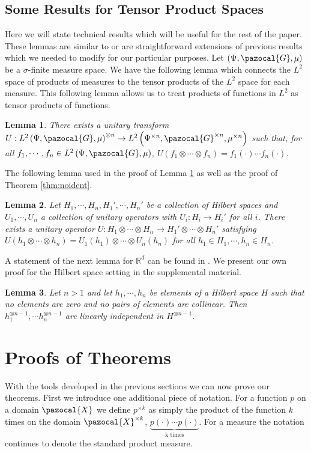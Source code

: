 \documentclass{article} %
\def\rn{\mathbb{R}}
\def\sG{\pazocal{G}}
\def\sX{\pazocal{X}}
\newtheorem{lem}{Lemma}
\theoremstyle{definition}
\begin{document}
\subsection{Some Results for Tensor Product Spaces}
Here we will state technical results which will be useful for the rest of the paper. These lemmas are similar to or  are straightforward extensions of previous results which we needed to modify for our particular purposes. Let $\left( \Psi, \sG, \mu \right)$ be a $\sigma$-finite measure space. We have the following lemma which connects the $L^2$ space of products of measures to the tensor products of the $L^2$ space for each measure. This following lemma allows us to treat products of functions in $L^2$ as tensor products of functions. 
\begin{lem}
	\label{lem:l2prod}
	There exists a unitary transform $U:L^2\left( \Psi, \sG, \mu \right)^{\otimes n} \to L^2\left( \Psi^{\times n}, \sG^{\times n}, \mu^{\times n} \right)$ such that, for all $f_1,\cdots, f_n \in L^2\left( \Psi, \sG, \mu \right)$, $U\left( f_1\otimes \cdots \otimes f_n \right) = f_1(\cdot)\cdots f_n(\cdot)$.
\end{lem}
The following lemma used in the proof of Lemma \ref{lem:l2prod} as well as the proof of Theorem \ref{thm:noident}.
\begin{lem} \label{lem:unitprod}
	Let $H_1,\cdots, H_n, H_1',\cdots, H_n'$ be a collection of Hilbert spaces and $U_1,\cdots,U_n$ a collection of unitary operators with $U_i:H_i \to H_i'$ for all $i$. There exists a unitary operator $U:H_1 \otimes \cdots \otimes H_n \to H_1' \otimes \cdots \otimes H_n'$ satisfying $U\left( h_1 \otimes\cdots \otimes h_n \right) = U_1(h_1) \otimes \cdots \otimes U_n(h_n)$ for all $h_1 \in H_1 ,\cdots, h_n \in H_n$.
\end{lem}
A statement of the next lemma for $\rn^d$ can be found in \cite{symtensorrank}. We present our own proof for the Hilbert space setting in the supplemental material.
\begin{lem}\label{lem:linind}
	Let $n>1$ and let $h_1,\cdots, h_n$ be elements of a Hilbert space $H$ such that no elements are zero and no pairs of elements are collinear. Then $h_1^{\otimes n-1},\cdots h_n^{\otimes n-1}$ are linearly independent in $H^{\otimes n-1}$.
\end{lem}

\section{Proofs of Theorems}
With the tools developed in the previous sections we can now prove our theorems. First we introduce one additional piece of notation. For a function $p$ on a domain $\sX$ we define $p^{\times k}$ as simply the product of the function $k$ times on the domain $\sX^{\times k}$, $\underbrace{p(\cdot)\cdots p(\cdot)}_{\text{k times}}$. For a measure the notation continues to denote the standard product measure.
\end{document}

